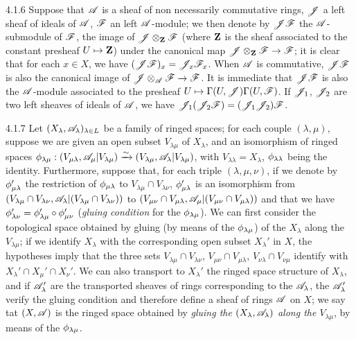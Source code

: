 \documentclass[10pt,oneside]{book}
\begin{document}
\begin{env}{4.1.6}
\label{env-0.4.1.6}
Suppose that $\mathscr{A}$ is a sheaf of non necessarily commutative rings, $\mathscr{J}$ a left sheaf
of ideals of $\mathscr{A}$, $\mathscr{F}$ an left $\mathscr{A}$-module; we then denote by $\mathscr{J}\mathscr{F}$ the
$\mathscr{A}$-submodule of $\mathscr{F}$, the image of $\mathscr{J}\otimes_\mathbf{Z}\mathscr{F}$ (where $\mathbf{Z}$ is
the sheaf associated to the constant presheaf $U\mapsto\mathbf{Z}$) under the canonical map
$\mathscr{J}\otimes_\mathbf{Z}\mathscr{F}\to\mathscr{F}$; it is clear that for each $x\in X$, we have
$(\mathscr{J}\mathscr{F})_x=\mathscr{J}_x\mathscr{F}_x$. When $\mathscr{A}$ is commutative, $\mathscr{J}\mathscr{F}$ is also
the canonical image of $\mathscr{J}\otimes_\mathscr{A}\mathscr{F}\to\mathscr{F}$. It is immediate that
$\mathscr{J}\mathscr{F}$ is also the $\mathscr{A}$-module associated to the presheaf
$U\mapsto\Gamma(U,\mathscr{J})\Gamma(U,\mathscr{F})$. If $\mathscr{J}_1$, $\mathscr{J}_2$ are two left sheaves
of ideals of $\mathscr{A}$, we have $\mathscr{J}_1(\mathscr{J}_2\mathscr{F})=(\mathscr{J}_1\mathscr{J}_2)\mathscr{F}$.
\end{env}

\begin{env}{4.1.7}
\label{env-0.4.1.7}
Let $(X_\lambda,\mathscr{A}_\lambda)_{\lambda\in L}$ be a family of ringed spaces; for each couple
$(\lambda,\mu)$, suppose we are given an open subset $V_{\lambda\mu}$ of $X_\lambda$, and an
isomorphism of ringed spaces
$\phi_{\lambda\mu}:(V_{\mu\lambda},\mathscr{A}_\mu|V_{\lambda\mu})\xrightarrow{\sim}
(V_{\lambda\mu},\mathscr{A}_\lambda|V_{\lambda\mu})$, with $V_{\lambda\lambda}=X_\lambda$,
$\phi_{\lambda\lambda}$ being the identity. Furthermore, suppose that, for each triple
$(\lambda,\mu,\nu)$, if we denote by $\phi_{\mu\lambda}'$ the restriction of
$\phi_{\mu\lambda}$ to $V_{\lambda\mu}\cap V_{\lambda\nu}$, $\phi_{\mu\lambda}'$ is an
isomorphism from
$(V_{\lambda\mu}\cap V_{\lambda\nu},\mathscr{A}_\lambda|(V_{\lambda\mu}\cap V_{\lambda\nu}))$ to
$(V_{\mu\nu}\cap V_{\mu\lambda},\mathscr{A}_\mu|(V_{\mu\nu}\cap V_{\mu\lambda}))$ and that we have
$\phi_{\lambda\nu}'=\phi_{\lambda\mu}'\circ\phi_{\mu\nu}'$ (\emph{gluing condition} for
the $\phi_{\lambda\mu}$). We can first consider the topological space obtained by gluing
(by means of the $\phi_{\lambda\mu}$) of the $X_\lambda$
along the $V_{\lambda\mu}$; if we identify $X_\lambda$ with the corresponding open subset
$X_\lambda'$ in $X$, the hypotheses imply that the three sets
$V_{\lambda\mu}\cap V_{\lambda\nu}$, $V_{\mu\nu}\cap V_{\mu\lambda}$,
$V_{\nu\lambda}\cap V_{\nu\mu}$ identify with $X_\lambda'\cap X_\mu'\cap X_\nu'$. We can
also transport to $X_\lambda'$ the ringed space structure of $X_\lambda$, and if
$\mathscr{A}_\lambda'$ are the transported sheaves of rings corresponding to the $\mathscr{A}_\lambda$,
the $\mathscr{A}_\lambda'$ verify the gluing condition  and therefore define a
sheaf of rings $\mathscr{A}$ on $X$; we say tat $(X,\mathscr{A})$ is the ringed space obtained by
\emph{gluing the $(X_\lambda,\mathscr{A}_\lambda)$ along the $V_{\lambda\mu}$}, by means of the
$\phi_{\lambda\mu}$.
\end{env}
\end{document}
